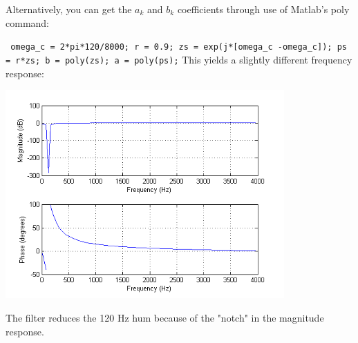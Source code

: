 \documentclass[]{siamltex}
\begin{document}
\begin{enumerate}
Alternatively, you can get the $a_k$ and $b_k$ coefficients through use of Matlab's poly command:

\texttt{
omega\_c = 2*pi*120/8000;\newline
r = 0.9; \newline
zs = exp(j*[omega\_c -omega\_c]);\newline
ps = r*zs; \newline
b = poly(zs); \newline
a = poly(ps);}
This yields a slightly different frequency response:

\includegraphics[width=0.8\textwidth]{notch_freq_response.png} 

The filter reduces the 120 Hz hum because of the "notch" in the magnitude response.


\end{enumerate}
\end{document}
